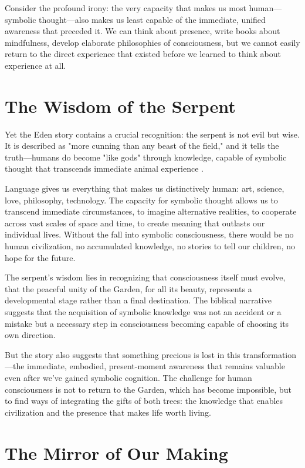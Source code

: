 Consider the profound irony: the very capacity that makes us most human—symbolic thought—also makes us least capable of the immediate, unified awareness that preceded it. We can think about presence, write books about mindfulness, develop elaborate philosophies of consciousness, but we cannot easily return to the direct experience that existed before we learned to think about experience at all.

\section{The Wisdom of the Serpent}

Yet the Eden story contains a crucial recognition: the serpent is not evil but wise. It is described as "more cunning than any beast of the field," and it tells the truth—humans do become "like gods" through knowledge, capable of symbolic thought that transcends immediate animal experience \parencite{genesis3:1,genesis3:5}.

Language gives us everything that makes us distinctively human: art, science, love, philosophy, technology. The capacity for symbolic thought allows us to transcend immediate circumstances, to imagine alternative realities, to cooperate across vast scales of space and time, to create meaning that outlasts our individual lives. Without the fall into symbolic consciousness, there would be no human civilization, no accumulated knowledge, no stories to tell our children, no hope for the future.

The serpent's wisdom lies in recognizing that consciousness itself must evolve, that the peaceful unity of the Garden, for all its beauty, represents a developmental stage rather than a final destination. The biblical narrative suggests that the acquisition of symbolic knowledge was not an accident or a mistake but a necessary step in consciousness becoming capable of choosing its own direction.

But the story also suggests that something precious is lost in this transformation—the immediate, embodied, present-moment awareness that remains valuable even after we've gained symbolic cognition. The challenge for human consciousness is not to return to the Garden, which has become impossible, but to find ways of integrating the gifts of both trees: the knowledge that enables civilization and the presence that makes life worth living.

\section{The Mirror of Our Making}

